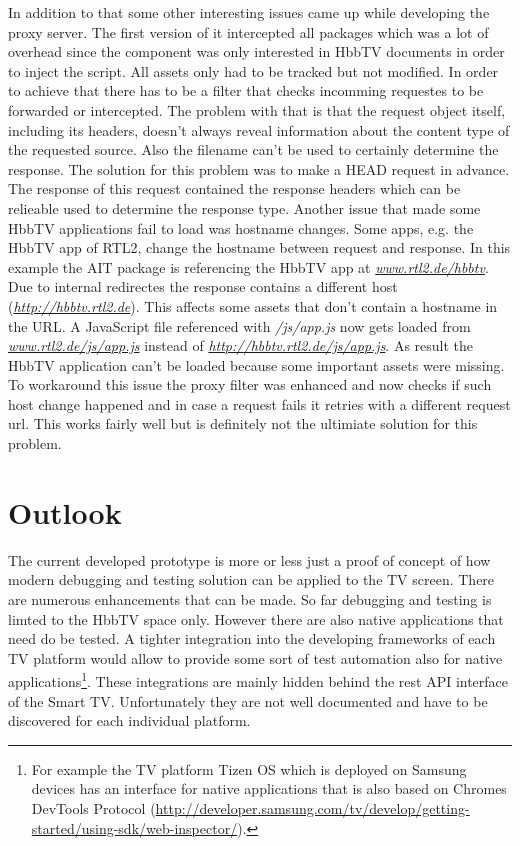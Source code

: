 In addition to that some other interesting issues came up while developing the proxy server. The first version of it
intercepted all packages which was a lot of overhead since the component was only interested in HbbTV documents in
order to inject the script. All assets only had to be tracked but not modified. In order to achieve that there has
to be a filter that checks incomming requestes to be forwarded or intercepted. The problem with that is that the
request object itself, including its headers, doesn't always reveal information about the content type of the requested
source. Also the filename can't be used to certainly determine the response. The solution for this problem was to make
a HEAD request in advance. The response of this request contained the response headers which can be relieable used
to determine the response type. Another issue that made some HbbTV applications fail to load was hostname changes.
Some apps, e.g. the HbbTV app of RTL2, change the hostname between request and response. In this example the AIT
package is referencing the HbbTV app at \textit{\url{www.rtl2.de/hbbtv}}. Due to internal redirectes the response
contains a different host (\textit{\url{http://hbbtv.rtl2.de}}). This affects some assets that don't contain a hostname
in the URL. A JavaScript file referenced with \textit{/js/app.js} now gets loaded from \textit{\url{www.rtl2.de/js/app.js}}
instead of \textit{\url{http://hbbtv.rtl2.de/js/app.js}}. As result the HbbTV application can't be loaded because
some important assets were missing. To workaround this issue the proxy filter was enhanced and now checks if such
host change happened and in case a request fails it retries with a different request url. This works fairly well
but is definitely not the ultimiate solution for this problem.

\section{Outlook\label{sec:outlook}}


The current developed prototype is more or less just a proof of concept of how modern debugging and testing solution
can be applied to the TV screen. There are numerous enhancements that can be made. So far debugging and testing is
limted to the HbbTV space only. However there are also native applications that need do be tested. A tighter integration
into the developing frameworks of each TV platform would allow to provide some sort of test automation also for native
applications\footnote{For example the TV platform Tizen OS which is deployed on Samsung devices has an interface for
native applications that is also based on Chromes DevTools Protocol (\url{http://developer.samsung.com/tv/develop/getting-started/using-sdk/web-inspector/}).}.
These integrations are mainly hidden behind the rest API interface of the Smart TV. Unfortunately they are not well
documented and have to be discovered for each individual platform.

